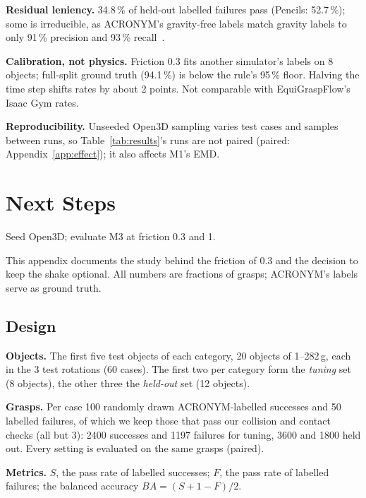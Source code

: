 \documentclass[conference]{IEEEtran}
\begin{document}
\textbf{Residual leniency.} 34.8\,\% of held-out labelled failures pass (Pencils: 52.7\,\%); some is
irreducible, as ACRONYM's gravity-free labels match gravity labels to only 91\,\% precision and 93\,\%
recall~\cite{eppner2021acronym}.

\textbf{Calibration, not physics.} Friction 0.3 fits another simulator's labels on 8 objects;
full-split ground truth (94.1\,\%) is below the rule's 95\,\% floor. Halving the time step shifts
rates by about 2 points. Not comparable with EquiGraspFlow's Isaac Gym rates.

\textbf{Reproducibility.} Unseeded Open3D sampling varies test cases and samples between runs, so
Table~\ref{tab:results}'s runs are not paired (paired: Appendix~\ref{app:effect}); it also affects M1's EMD.

\section{Next Steps}

Seed Open3D; evaluate M3 at friction 0.3 and 1.




\clearpage
{}

This appendix documents the study behind the friction of 0.3 and the decision to keep the shake optional.
All numbers are fractions of grasps; ACRONYM's labels serve as ground truth.

\subsection{Design}\label{app:design}

\textbf{Objects.} The first five test objects of each category, 20 objects of 1--282\,g, each in the 3
test rotations (60 cases). The first two per category form the \emph{tuning} set (8 objects), the other
three the \emph{held-out} set (12 objects).

\textbf{Grasps.} Per case 100 randomly drawn ACRONYM-labelled successes and 50 labelled failures, of
which we keep those that pass our collision and contact checks (all but 3): 2400 successes and 1197
failures for tuning, 3600 and 1800 held out. Every setting is evaluated on the same grasps (paired).

\textbf{Metrics.} $S$, the pass rate of labelled successes; $F$, the pass rate of labelled failures; the
balanced accuracy $\mathit{BA} = (S + 1 - F)/2$.
\end{document}
